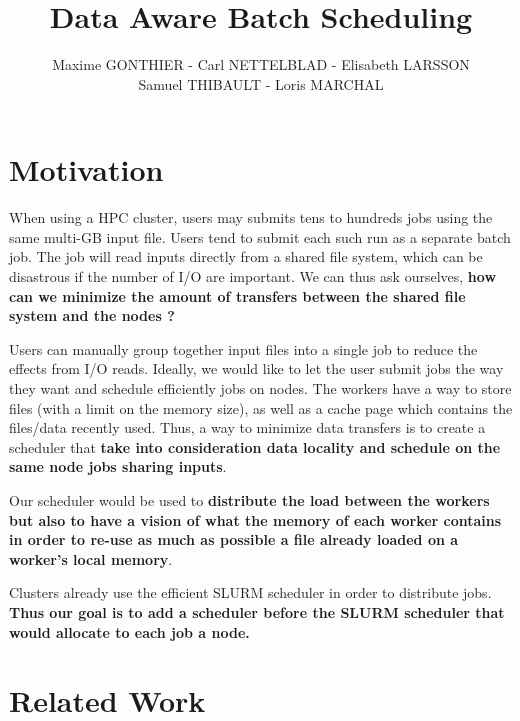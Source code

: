 \documentclass[a4paper]{article}
\title{Data Aware Batch Scheduling}
\author{Maxime GONTHIER - Carl NETTELBLAD - Elisabeth LARSSON \\ Samuel THIBAULT - Loris MARCHAL}
\begin{document}
\maketitle
\tableofcontents
\listoffigures
\newpage


\section{Motivation}

When using a HPC cluster, users may submits tens to hundreds jobs using the same multi-GB input file.
Users tend to submit each such run as a separate batch job.
The job will read inputs directly from a shared file system, which can be disastrous if the number of I/O are important.
We can thus ask ourselves, \textbf{how can we minimize the amount of transfers between the shared file system and the nodes ?}

Users can manually group together input files into a single job to reduce the effects from I/O reads.
Ideally, we would like to let the user submit jobs the way they want and schedule efficiently jobs on nodes.
The workers have a way to store files (with a limit on the memory size), as well as a cache page which contains the files/data recently used.
Thus, a way to minimize data transfers is to create a scheduler that \textbf{take into consideration data locality and schedule on the same node jobs sharing inputs}.

Our scheduler would be used to \textbf{distribute the load between the workers but also to have a vision of what the memory of each worker contains in order to re-use as much as possible a file already loaded on a worker's local memory}.

Clusters already use the efficient SLURM scheduler in order to distribute jobs.
\textbf{Thus our goal is to add a scheduler before the SLURM scheduler that would allocate to each job a node.}

\section{Related Work}
\end{document}
